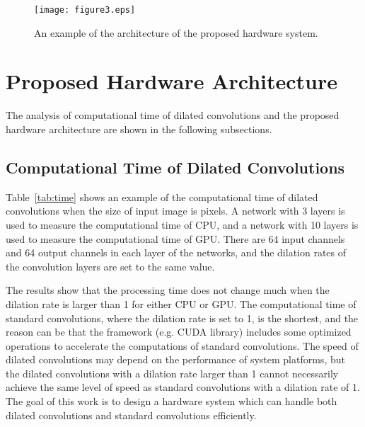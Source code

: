 \documentclass[10pt,twocolumn,letterpaper]{article}
\begin{document}
\begin{figure}[t]
\begin{center}
   \texttt{[image: figure3.eps]}\\
\end{center}
   \caption{An example of the architecture of the proposed hardware system.}
\label{fig:system}
\end{figure}

\section{Proposed Hardware Architecture}
\label{sec:architecture}

The analysis of computational time of dilated convolutions and the proposed hardware architecture are shown in the following subsections.


\subsection{Computational Time of Dilated Convolutions}
\label{subsec:time}

Table~\ref{tab:time} shows an example of the computational time of dilated convolutions when the size of input image is  pixels. A network with 3 layers is used to measure the computational time of CPU, and a network with 10 layers is used to measure the computational time of GPU. There are 64 input channels and 64 output channels in each layer of the networks, and the dilation rates  of the  convolution layers are set to the same value. 

The results show that the processing time does not change much when the dilation rate  is larger than 1 for either CPU or GPU. The computational time of standard convolutions, where the dilation rate is set to 1, is the shortest, and the reason can be that the framework (e.g. CUDA library) includes some optimized operations to accelerate the computations of standard convolutions. The speed of dilated convolutions may depend on the performance of system platforms, but the dilated convolutions with a dilation rate larger than 1 cannot necessarily achieve the same level of speed as standard convolutions with a dilation rate of 1. The goal of this work is to design a hardware system which can handle both dilated convolutions and standard convolutions efficiently.
\end{document}

